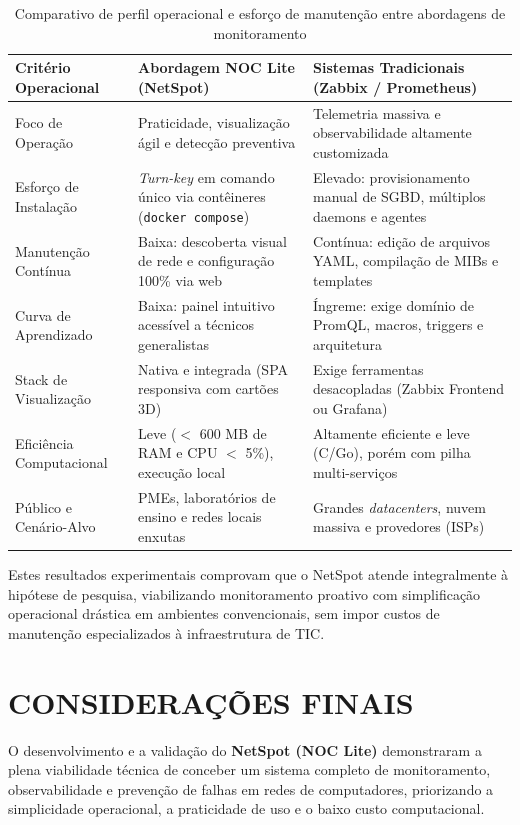\documentclass[12pt,a4paper]{article}
\newcommand{\fonte}[1]{\par\vspace{-0.5em}{\small Fonte: #1}\par}
\begin{document}
\begin{table}[H]
\centering
\caption{Comparativo de perfil operacional e esforço de manutenção entre abordagens de monitoramento}
\label{tab:comparativo_requisitos}
\small
\begin{tabular}{@{}p{3.5cm}p{5.5cm}p{5.7cm}@{}}
\toprule
\textbf{Critério Operacional} & \textbf{Abordagem NOC Lite (NetSpot)} & \textbf{Sistemas Tradicionais (Zabbix / Prometheus)} \\
\midrule
Foco de Operação & Praticidade, visualização ágil e detecção preventiva & Telemetria massiva e observabilidade altamente customizada \\
Esforço de Instalação & \textit{Turn-key} em comando único via contêineres (\texttt{docker compose}) & Elevado: provisionamento manual de SGBD, múltiplos daemons e agentes \\
Manutenção Contínua & Baixa: descoberta visual de rede e configuração 100\% via web & Contínua: edição de arquivos YAML, compilação de MIBs e templates \\
Curva de Aprendizado & Baixa: painel intuitivo acessível a técnicos generalistas & Íngreme: exige domínio de PromQL, macros, triggers e arquitetura \\
Stack de Visualização & Nativa e integrada (SPA responsiva com cartões 3D) & Exige ferramentas desacopladas (Zabbix Frontend ou Grafana) \\
Eficiência Computacional & Leve ($<$ 600 MB de RAM e CPU $<$ 5\%), execução local & Altamente eficiente e leve (C/Go), porém com pilha multi-serviços \\
Público e Cenário-Alvo & PMEs, laboratórios de ensino e redes locais enxutas & Grandes \textit{datacenters}, nuvem massiva e provedores (ISPs) \\
\bottomrule
\end{tabular}
\fonte{Autoria própria (2026).}
\end{table}

Estes resultados experimentais comprovam que o NetSpot atende integralmente à hipótese de pesquisa, viabilizando monitoramento proativo com simplificação operacional drástica em ambientes convencionais, sem impor custos de manutenção especializados à infraestrutura de TIC.

\section{CONSIDERAÇÕES FINAIS}
O desenvolvimento e a validação do \textbf{NetSpot (NOC Lite)} demonstraram a plena viabilidade técnica de conceber um sistema completo de monitoramento, observabilidade e prevenção de falhas em redes de computadores, priorizando a simplicidade operacional, a praticidade de uso e o baixo custo computacional.
\end{document}
